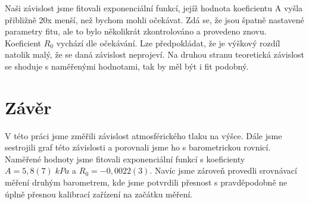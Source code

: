 Naši závislost jsme fitovali exponenciální funkcí, jejíž hodnota koeficientu A vyšla přibližně 20x menší, než bychom mohli očekávat. Zdá se, že jsou špatně nastavené parametry fitu, ale to bylo několikrát zkontrolováno a provedeno znovu. Koeficient $R_0$ vychází dle očekávání. Lze předpokládat, že je výškový rozdíl natolik malý, že se daná závislost neprojeví. Na druhou stranu teoretická závislost se shoduje s naměřenými hodnotami, tak by měl být i fit podobný.

\newpage

\section{Závěr}

V této práci jsme změřili závislost atmosférického tlaku na výšce. Dále jsme sestrojili graf této závislosti a porovnali jsme ho s barometrickou rovnicí. Naměřené hodnoty jsme fitovali exponenciální funkcí s koeficienty $A = 5,8(7) \; kPa$ a $R_0 = -0,0022(3)$. Navíc jsme zároveň provedli srovnávací měření druhým barometrem, kde jsme potvrdili přesnost s pravděpodobně ne úplně přesnou kalibrací zařízení na začátku měření.